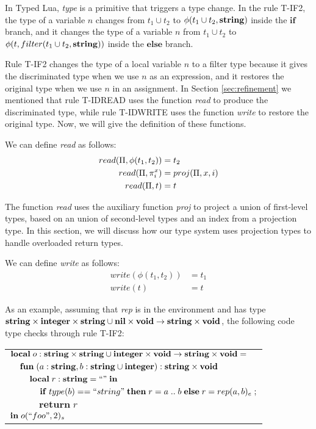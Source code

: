In Typed Lua, \emph{type} is a primitive that triggers a type change.
In the rule \textsc{T-IF2}, the type of a variable $n$ changes from
$t_{1} \cup t_{2}$ to $\phi(t_{1} \cup t_{2},\mathbf{string})$ inside the
$\mathbf{if}$ branch, and it changes the type of a variable $n$ from
$t_{1} \cup t_{2}$ to $\phi(t,filter(t_{1} \cup t_{2},\mathbf{string}))$
inside the $\mathbf{else}$ branch.

Rule \textsc{T-IF2} changes the type of a local variable $n$ to a
filter type because it gives the discriminated type when we use $n$ as
an expression, and it restores the original type when we use $n$
in an assignment.
In Section \ref{sec:refinement} we mentioned that rule \textsc{T-IDREAD}
uses the function \emph{read} to produce the discriminated type,
while rule \textsc{T-IDWRITE} uses the function \emph{write} to
restore the original type.
Now, we will give the definition of these functions.

We can define \emph{read} as follows:
\begin{align*}
read(\Pi, \phi(t_{1},t_{2})) & = t_{2}\\
read(\Pi, \pi_{i}^{x}) & = proj(\Pi, x, i)\\
read(\Pi, t) & = t
\end{align*}

The function \emph{read} uses the auxiliary function \emph{proj}
to project a union of first-level types, based on an union of
second-level types and an index from a projection type.
In this section, we will discuss how our type system uses
projection types to handle overloaded return types.

We can define \emph{write} as follows:
\begin{align*}
write(\phi(t_{1},t_{2})) & = t_{1}\\
write(t) & = t
\end{align*}

As an example, assuming that \emph{rep} is in the environment and has type
$\mathbf{string} \times \mathbf{integer} \times \mathbf{string} \cup \mathbf{nil} \times \mathbf{void} \rightarrow \mathbf{string} \times \mathbf{void}$,
the following code type checks through rule \textsc{T-IF2}:
\begin{center}
\begin{tabular}{llll}
\multicolumn{4}{l}{$\mathbf{local} \; o:\mathbf{string} \times \mathbf{string} \cup \mathbf{integer} \times \mathbf{void} \rightarrow \mathbf{string} \times \mathbf{void} =$}\\
& \multicolumn{3}{l}{$\mathbf{fun} \; (a:\mathbf{string}, b:\mathbf{string} \cup \mathbf{integer}):\mathbf{string} \times \mathbf{void}$}\\
& & \multicolumn{2}{l}{$\mathbf{local} \; r:\mathbf{string} = ``" \; \mathbf{in}$}\\
& & & \multicolumn{1}{l}{$\mathbf{if} \; type(b) == ``string" \; \mathbf{then} \; r = a \;{..}\;b \; \mathbf{else} \; r = rep(a, b)_{e}\; ;$}\\
& & & \multicolumn{1}{l}{$\mathbf{return} \; r$}\\
\multicolumn{4}{l}{$\mathbf{in} \; o(``foo", 2)_{s}$}
\end{tabular}
\end{center}

